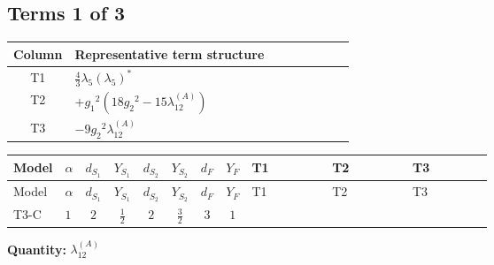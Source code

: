\documentclass[8pt]{article}
\begin{document}
\begin{landscape}
\subsection*{Terms 1 of 3}
\begin{center}
\begin{tabular}{@{}c >{\raggedright\arraybackslash}p{0.82\linewidth}@{}}
\toprule
Column & Representative term structure \\
\midrule
T1 & \(\displaystyle \frac{4}{3} {\lambda_5} \left({\lambda_5}\right)^{*}\) \\
\midrule
T2 & \(\displaystyle +{g_1}^2 \left(18 {g_2}^2-15 {\lambda_{12}^{(A)}}\right)\) \\
\midrule
T3 & \(\displaystyle -9 {g_2}^2 {\lambda_{12}^{(A)}}\) \\
\midrule
\bottomrule
\end{tabular}
\end{center}
\smallskip
\tiny
\begin{longtable}{@{}llcccccc >{\raggedright\arraybackslash}p{0.21\linewidth} >{\raggedright\arraybackslash}p{0.21\linewidth} >{\raggedright\arraybackslash}p{0.21\linewidth}@{}}
\toprule
Model & $\alpha$ & $d_{S_1}$ & $Y_{S_1}$ & $d_{S_2}$ & $Y_{S_2}$ & $d_F$ & $Y_F$ & T1 & T2 & T3 \\
\midrule
\endfirsthead
\toprule
Model & $\alpha$ & $d_{S_1}$ & $Y_{S_1}$ & $d_{S_2}$ & $Y_{S_2}$ & $d_F$ & $Y_F$ & T1 & T2 & T3 \\
\midrule
\endhead
T3-C & $1$ & $2$ & $\frac{1}{2}$ & $2$ & $\frac{3}{2}$ & $3$ & $1$ & \scriptsize\adjustbox{max width=\linewidth}{$\begin{gathered} \frac{4}{3} {\lambda_5} \left({\lambda_5}\right)^{*}\end{gathered}$} & \scriptsize\adjustbox{max width=\linewidth}{$\begin{gathered} +{g_1}^2 \left(18 {g_2}^2-15 {\lambda_{12}^{(A)}}\right)\end{gathered}$} & \scriptsize\adjustbox{max width=\linewidth}{$\begin{gathered} -9 {g_2}^2 {\lambda_{12}^{(A)}}\end{gathered}$} \\
\midrule
\bottomrule
\end{longtable}
\clearpage
\noindent\textbf{Quantity: }$\lambda_{12}^{(A)}$\par\smallskip

\end{landscape}
\end{document}
